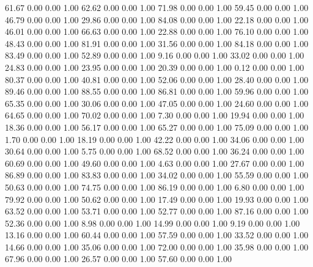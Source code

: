    61.67   0.00   0.00   1.00
   62.62   0.00   0.00   1.00
   71.98   0.00   0.00   1.00
   59.45   0.00   0.00   1.00
   46.79   0.00   0.00   1.00
   29.86   0.00   0.00   1.00
   84.08   0.00   0.00   1.00
   22.18   0.00   0.00   1.00
   46.01   0.00   0.00   1.00
   66.63   0.00   0.00   1.00
   22.88   0.00   0.00   1.00
   76.10   0.00   0.00   1.00
   48.43   0.00   0.00   1.00
   81.91   0.00   0.00   1.00
   31.56   0.00   0.00   1.00
   84.18   0.00   0.00   1.00
   83.49   0.00   0.00   1.00
   52.89   0.00   0.00   1.00
    9.16   0.00   0.00   1.00
   33.02   0.00   0.00   1.00
   24.83   0.00   0.00   1.00
   23.95   0.00   0.00   1.00
   20.39   0.00   0.00   1.00
    0.12   0.00   0.00   1.00
   80.37   0.00   0.00   1.00
   40.81   0.00   0.00   1.00
   52.06   0.00   0.00   1.00
   28.40   0.00   0.00   1.00
   89.46   0.00   0.00   1.00
   88.55   0.00   0.00   1.00
   86.81   0.00   0.00   1.00
   59.96   0.00   0.00   1.00
   65.35   0.00   0.00   1.00
   30.06   0.00   0.00   1.00
   47.05   0.00   0.00   1.00
   24.60   0.00   0.00   1.00
   64.65   0.00   0.00   1.00
   70.02   0.00   0.00   1.00
    7.30   0.00   0.00   1.00
   19.94   0.00   0.00   1.00
   18.36   0.00   0.00   1.00
   56.17   0.00   0.00   1.00
   65.27   0.00   0.00   1.00
   75.09   0.00   0.00   1.00
    1.70   0.00   0.00   1.00
   18.19   0.00   0.00   1.00
   42.22   0.00   0.00   1.00
   34.06   0.00   0.00   1.00
   30.64   0.00   0.00   1.00
    5.75   0.00   0.00   1.00
   68.52   0.00   0.00   1.00
   36.24   0.00   0.00   1.00
   60.69   0.00   0.00   1.00
   49.60   0.00   0.00   1.00
    4.63   0.00   0.00   1.00
   27.67   0.00   0.00   1.00
   86.89   0.00   0.00   1.00
   83.83   0.00   0.00   1.00
   34.02   0.00   0.00   1.00
   55.59   0.00   0.00   1.00
   50.63   0.00   0.00   1.00
   74.75   0.00   0.00   1.00
   86.19   0.00   0.00   1.00
    6.80   0.00   0.00   1.00
   79.92   0.00   0.00   1.00
   50.62   0.00   0.00   1.00
   17.49   0.00   0.00   1.00
   19.93   0.00   0.00   1.00
   63.52   0.00   0.00   1.00
   53.71   0.00   0.00   1.00
   52.77   0.00   0.00   1.00
   87.16   0.00   0.00   1.00
   52.36   0.00   0.00   1.00
    8.98   0.00   0.00   1.00
   14.99   0.00   0.00   1.00
    9.19   0.00   0.00   1.00
   13.16   0.00   0.00   1.00
   60.44   0.00   0.00   1.00
   57.59   0.00   0.00   1.00
   33.52   0.00   0.00   1.00
   14.66   0.00   0.00   1.00
   35.06   0.00   0.00   1.00
   72.00   0.00   0.00   1.00
   35.98   0.00   0.00   1.00
   67.96   0.00   0.00   1.00
   26.57   0.00   0.00   1.00
   57.60   0.00   0.00   1.00
